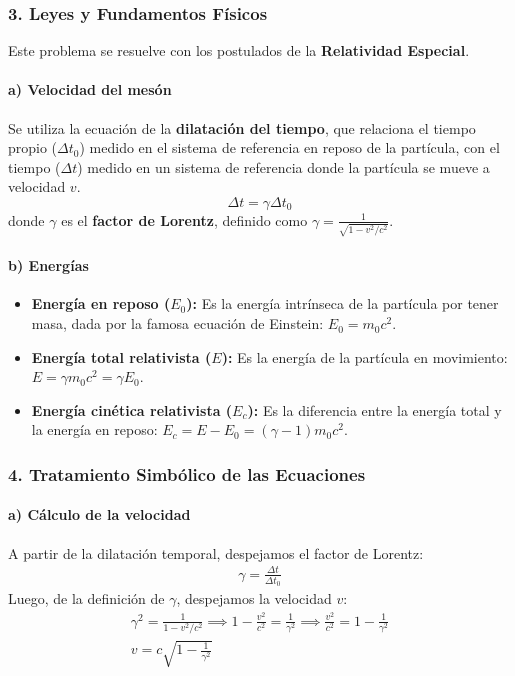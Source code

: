 \subsubsection*{3. Leyes y Fundamentos Físicos}
Este problema se resuelve con los postulados de la \textbf{Relatividad Especial}.
\paragraph*{a) Velocidad del mesón}
Se utiliza la ecuación de la \textbf{dilatación del tiempo}, que relaciona el tiempo propio ($\Delta t_0$) medido en el sistema de referencia en reposo de la partícula, con el tiempo ($\Delta t$) medido en un sistema de referencia donde la partícula se mueve a velocidad $v$.
\[ \Delta t = \gamma \Delta t_0 \]
donde $\gamma$ es el \textbf{factor de Lorentz}, definido como $\gamma = \frac{1}{\sqrt{1 - v^2/c^2}}$.

\paragraph*{b) Energías}
\begin{itemize}
    \item \textbf{Energía en reposo ($E_0$):} Es la energía intrínseca de la partícula por tener masa, dada por la famosa ecuación de Einstein: $E_0 = m_0 c^2$.
    \item \textbf{Energía total relativista ($E$):} Es la energía de la partícula en movimiento: $E = \gamma m_0 c^2 = \gamma E_0$.
    \item \textbf{Energía cinética relativista ($E_c$):} Es la diferencia entre la energía total y la energía en reposo: $E_c = E - E_0 = (\gamma - 1)m_0 c^2$.
\end{itemize}

\subsubsection*{4. Tratamiento Simbólico de las Ecuaciones}
\paragraph*{a) Cálculo de la velocidad}
A partir de la dilatación temporal, despejamos el factor de Lorentz:
\begin{gather}
    \gamma = \frac{\Delta t}{\Delta t_0} \label{eq:gamma_calc}
\end{gather}
Luego, de la definición de $\gamma$, despejamos la velocidad $v$:
\begin{gather}
    \gamma^2 = \frac{1}{1 - v^2/c^2} \implies 1 - \frac{v^2}{c^2} = \frac{1}{\gamma^2} \implies \frac{v^2}{c^2} = 1 - \frac{1}{\gamma^2} \nonumber \\
    v = c \sqrt{1 - \frac{1}{\gamma^2}} \label{eq:velocidad_relativista}
\end{gather}

